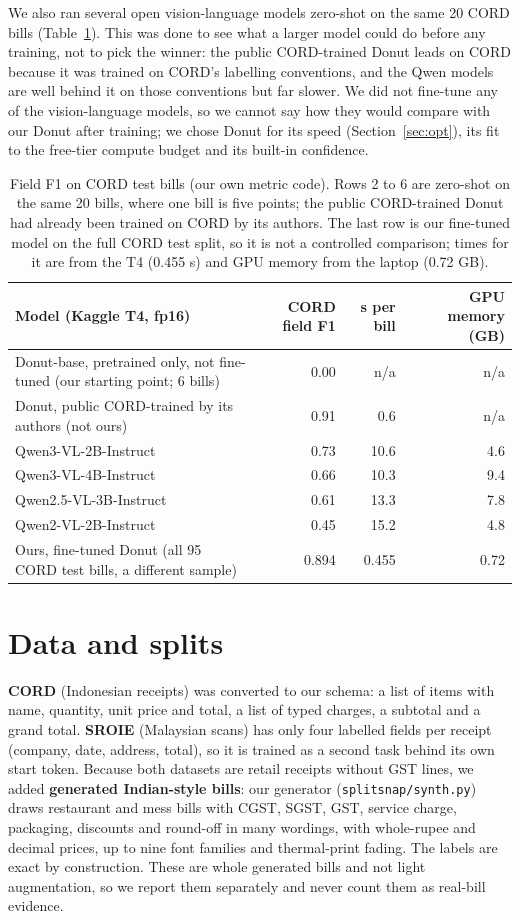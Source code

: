 \documentclass[10pt,a4paper]{article}
\begin{document}
We also ran several open vision-language models zero-shot on the same 20 CORD bills (Table~\ref{tab:zs}). This was done to see what a larger model could do before any training, not to pick the winner: the public CORD-trained Donut leads on CORD because it was trained on CORD's labelling conventions, and the Qwen models are well behind it on those conventions but far slower. We did not fine-tune any of the vision-language models, so we cannot say how they would compare with our Donut after training; we chose Donut for its speed (Section~\ref{sec:opt}), its fit to the free-tier compute budget and its built-in confidence.

\begin{table}[!ht]
\centering\small
\begin{tabular}{@{}lrrr@{}}
\toprule
Model (Kaggle T4, fp16) & CORD field F1 & s per bill & GPU memory (GB)\\
\midrule
Donut-base, pretrained only, not fine-tuned (our starting point; 6 bills) & 0.00 & n/a & n/a\\
Donut, public CORD-trained by its authors (not ours) & 0.91 & 0.6 & n/a\\
Qwen3-VL-2B-Instruct & 0.73 & 10.6 & 4.6\\
Qwen3-VL-4B-Instruct & 0.66 & 10.3 & 9.4\\
Qwen2.5-VL-3B-Instruct & 0.61 & 13.3 & 7.8\\
Qwen2-VL-2B-Instruct & 0.45 & 15.2 & 4.8\\
\midrule
Ours, fine-tuned Donut (all 95 CORD test bills, a different sample) & 0.894 & 0.455 & 0.72\\
\bottomrule
\end{tabular}
\caption{Field F1 on CORD test bills (our own metric code). Rows 2 to 6 are zero-shot on the same 20 bills, where one bill is five points; the public CORD-trained Donut had already been trained on CORD by its authors. The last row is our fine-tuned model on the full CORD test split, so it is not a controlled comparison; times for it are from the T4 (0.455 s) and GPU memory from the laptop (0.72 GB).}\label{tab:zs}
\end{table}

\section{Data and splits}\label{sec:data}
\textbf{CORD} (Indonesian receipts) was converted to our schema: a list of items with name, quantity, unit price and total, a list of typed charges, a subtotal and a grand total. \textbf{SROIE} (Malaysian scans) has only four labelled fields per receipt (company, date, address, total), so it is trained as a second task behind its own start token. Because both datasets are retail receipts without GST lines, we added \textbf{generated Indian-style bills}: our generator (\texttt{splitsnap/synth.py}) draws restaurant and mess bills with CGST, SGST, GST, service charge, packaging, discounts and round-off in many wordings, with whole-rupee and decimal prices, up to nine font families and thermal-print fading. The labels are exact by construction. These are whole generated bills and not light augmentation, so we report them separately and never count them as real-bill evidence.
\end{document}
